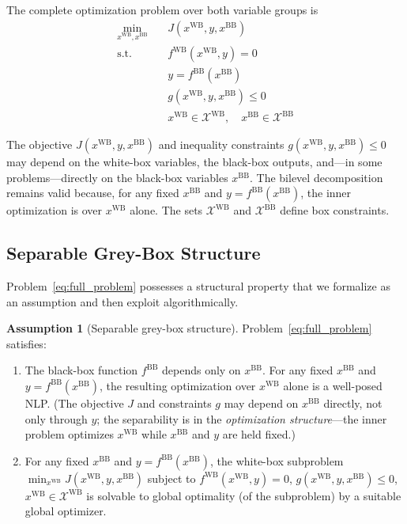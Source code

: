 \documentclass[12pt,a4paper]{article}%
\theoremstyle{plain}%
\theoremstyle{remark}%
\theoremstyle{definition}%
\newtheorem{assumption}{Assumption}%
\def\WB{\mathrm{WB}}
\def\BB{\mathrm{BB}}
\begin{document}
The complete optimization problem over both variable groups is
\begin{subequations}\label{eq:full_problem}
\begin{align}
    \min_{x^{\WB}, x^{\BB}} \quad & J(x^{\WB}, y, x^{\BB}) \label{eq:objective}\\
    \text{s.t.} \quad & f^{\WB}(x^{\WB}, y) = 0 \label{eq:process_constraint}\\
    & y = f^{\BB}(x^{\BB}) \label{eq:material_constraint}\\
    & g(x^{\WB}, y, x^{\BB}) \leq 0 \label{eq:inequality_constraints}\\
    & x^{\WB} \in \mathcal{X}^{\WB}, \quad x^{\BB} \in \mathcal{X}^{\BB} \label{eq:bounds}
\end{align}
\end{subequations}

The objective $J(x^{\WB}, y, x^{\BB})$ and inequality constraints $g(x^{\WB}, y, x^{\BB}) \leq 0$ may depend on the white-box variables, the black-box outputs, and---in some problems---directly on the black-box variables $x^{\BB}$. The bilevel decomposition remains valid because, for any fixed $x^{\BB}$ and $y = f^{\BB}(x^{\BB})$, the inner optimization is over $x^{\WB}$ alone. The sets $\mathcal{X}^{\WB}$ and $\mathcal{X}^{\BB}$ define box constraints.

\subsection{Separable Grey-Box Structure}\label{subsec:separability}

Problem~\eqref{eq:full_problem} possesses a structural property that we formalize as an assumption and then exploit algorithmically.

\begin{assumption}[Separable grey-box structure]\label{ass:separability}
Problem~\eqref{eq:full_problem} satisfies:
\begin{enumerate}
    \item[(i)] The black-box function $f^{\BB}$ depends only on $x^{\BB}$. For any fixed $x^{\BB}$ and $y = f^{\BB}(x^{\BB})$, the resulting optimization over $x^{\WB}$ alone is a well-posed NLP. (The objective $J$ and constraints $g$ may depend on $x^{\BB}$ directly, not only through $y$; the separability is in the \emph{optimization structure}---the inner problem optimizes $x^{\WB}$ while $x^{\BB}$ and $y$ are held fixed.)
    \item[(ii)] For any fixed $x^{\BB}$ and $y = f^{\BB}(x^{\BB})$, the white-box subproblem $\min_{x^{\WB}} J(x^{\WB}, y, x^{\BB})$ subject to $f^{\WB}(x^{\WB}, y) = 0$, $g(x^{\WB}, y, x^{\BB}) \leq 0$, $x^{\WB} \in \mathcal{X}^{\WB}$ is solvable to global optimality (of the subproblem) by a suitable global optimizer.
\end{enumerate}
\end{assumption}
\end{document}
